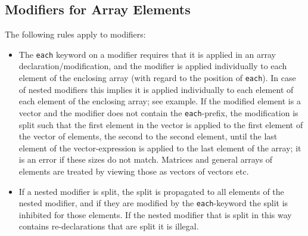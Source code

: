 \subsection{Modifiers for Array Elements}\label{modifiers-for-array-elements}

The following rules apply to modifiers:
\begin{itemize}
\item
  The \lstinline!each! keyword on a modifier requires that it is applied in an array
  declaration/modification, and the modifier is applied individually to
  each element of the enclosing array (with regard to the position of \lstinline!each!).
  In case of nested modifiers this implies it
  is applied individually to each element of each element of the
  enclosing array; see example. If the modified element is a vector and
  the modifier does not contain the \lstinline!each!-prefix, the modification is
  split such that the first element in the vector is applied to the
  first element of the vector of elements, the second to the second
  element, until the last element of the vector-expression is applied to
  the last element of the array; it is an error if these sizes do not
  match. Matrices and general arrays of elements are treated by viewing
  those as vectors of vectors etc.
\item
  If a nested modifier is split, the split is propagated to all elements
  of the nested modifier, and if they are modified by the \lstinline!each!-keyword
  the split is inhibited for those elements. If the nested modifier that
  is split in this way contains re-declarations that are split it is
  illegal.
\end{itemize}

